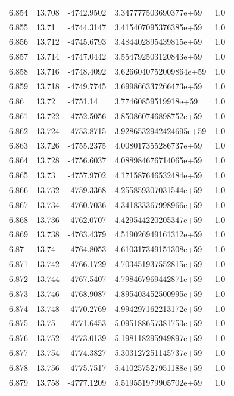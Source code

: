 \begin{tabular}{lllll}
6.854 & 13.708 & -4742.9502 & 3.347777503690377e+59 & 1.0 \\
6.855 & 13.71 & -4744.3147 & 3.415407095376385e+59 & 1.0 \\
6.856 & 13.712 & -4745.6793 & 3.484402895439815e+59 & 1.0 \\
6.857 & 13.714 & -4747.0442 & 3.554792503120843e+59 & 1.0 \\
6.858 & 13.716 & -4748.4092 & 3.6266040752009864e+59 & 1.0 \\
6.859 & 13.718 & -4749.7745 & 3.699866337266473e+59 & 1.0 \\
6.86 & 13.72 & -4751.14 & 3.77460859519918e+59 & 1.0 \\
6.861 & 13.722 & -4752.5056 & 3.850860746898752e+59 & 1.0 \\
6.862 & 13.724 & -4753.8715 & 3.9286532942424695e+59 & 1.0 \\
6.863 & 13.726 & -4755.2375 & 4.008017355286737e+59 & 1.0 \\
6.864 & 13.728 & -4756.6037 & 4.088984676714065e+59 & 1.0 \\
6.865 & 13.73 & -4757.9702 & 4.171587646532484e+59 & 1.0 \\
6.866 & 13.732 & -4759.3368 & 4.255859307031544e+59 & 1.0 \\
6.867 & 13.734 & -4760.7036 & 4.341833367998966e+59 & 1.0 \\
6.868 & 13.736 & -4762.0707 & 4.429544220205347e+59 & 1.0 \\
6.869 & 13.738 & -4763.4379 & 4.519026949161312e+59 & 1.0 \\
6.87 & 13.74 & -4764.8053 & 4.610317349151308e+59 & 1.0 \\
6.871 & 13.742 & -4766.1729 & 4.703451937552815e+59 & 1.0 \\
6.872 & 13.744 & -4767.5407 & 4.798467969442871e+59 & 1.0 \\
6.873 & 13.746 & -4768.9087 & 4.895403452500995e+59 & 1.0 \\
6.874 & 13.748 & -4770.2769 & 4.994297162213172e+59 & 1.0 \\
6.875 & 13.75 & -4771.6453 & 5.095188657381753e+59 & 1.0 \\
6.876 & 13.752 & -4773.0139 & 5.198118295949897e+59 & 1.0 \\
6.877 & 13.754 & -4774.3827 & 5.303127251145737e+59 & 1.0 \\
6.878 & 13.756 & -4775.7517 & 5.410257527951188e+59 & 1.0 \\
6.879 & 13.758 & -4777.1209 & 5.519551979905702e+59 & 1.0 \\

\end{tabular}
